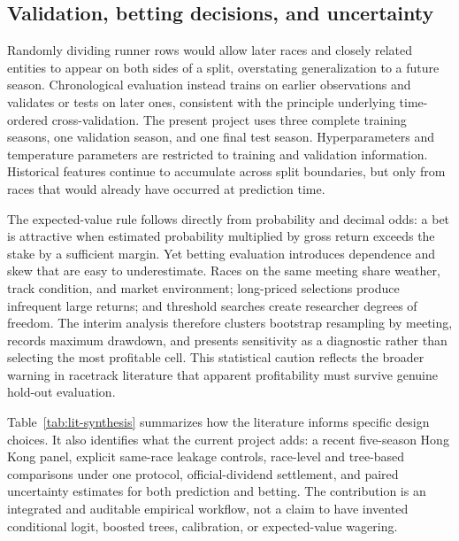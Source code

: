 \subsection{Validation, betting decisions, and uncertainty}\label{sec:lit-validation}
Randomly dividing runner rows would allow later races and closely related entities to appear on both sides of a split, overstating generalization to a future season. Chronological evaluation instead trains on earlier observations and validates or tests on later ones, consistent with the principle underlying time-ordered cross-validation\cite{sklearn_timesplit}. The present project uses three complete training seasons, one validation season, and one final test season. Hyperparameters and temperature parameters are restricted to training and validation information. Historical features continue to accumulate across split boundaries, but only from races that would already have occurred at prediction time.

The expected-value rule follows directly from probability and decimal odds: a bet is attractive when estimated probability multiplied by gross return exceeds the stake by a sufficient margin. Yet betting evaluation introduces dependence and skew that are easy to underestimate. Races on the same meeting share weather, track condition, and market environment; long-priced selections produce infrequent large returns; and threshold searches create researcher degrees of freedom. The interim analysis therefore clusters bootstrap resampling by meeting, records maximum drawdown, and presents sensitivity as a diagnostic rather than selecting the most profitable cell. This statistical caution reflects the broader warning in racetrack literature that apparent profitability must survive genuine hold-out evaluation\cite{bolton1986,benter1994}.

Table~\ref{tab:lit-synthesis} summarizes how the literature informs specific design choices. It also identifies what the current project adds: a recent five-season Hong Kong panel, explicit same-race leakage controls, race-level and tree-based comparisons under one protocol, official-dividend settlement, and paired uncertainty estimates for both prediction and betting. The contribution is an integrated and auditable empirical workflow, not a claim to have invented conditional logit, boosted trees, calibration, or expected-value wagering.

